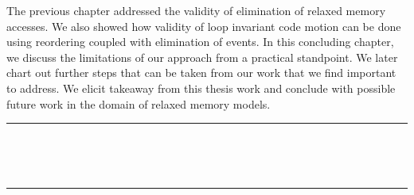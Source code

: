 The previous chapter addressed the validity of elimination of relaxed memory accesses. 
We also showed how validity of loop invariant code motion can be done using reordering coupled with elimination of events. 
In this concluding chapter, we discuss the limitations of our approach from a practical standpoint.
We later chart out further steps that can be taken from our work that we find important to address. 
We elicit takeaway from this thesis work and conclude with possible future work in the domain of relaxed memory models.
\ \newline
\ \newline  
\hrule 
\ \newline 
\ \newline 











\ \newline
\ \newline  
\hrule 
\ \newline 
\ \newline 
